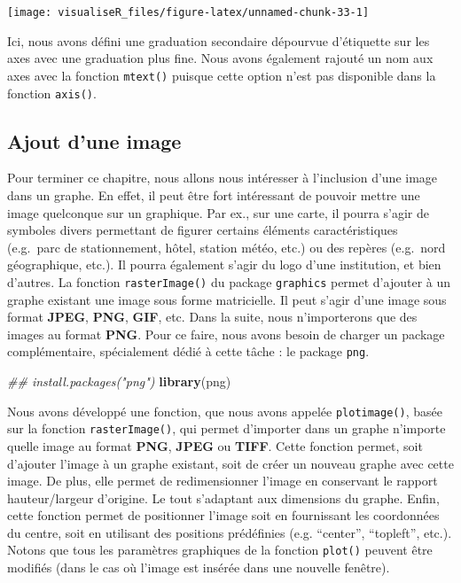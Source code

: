 \documentclass[]{article}
\newenvironment{Shaded}{\begin{snugshade}}{\end{snugshade}}
\newcommand{\CommentTok}[1]{\textcolor[rgb]{0.56,0.35,0.01}{\textit{#1}}}
\newcommand{\KeywordTok}[1]{\textcolor[rgb]{0.13,0.29,0.53}{\textbf{#1}}}
\newcommand{\NormalTok}[1]{#1}
\begin{document}
\begin{center}\texttt{[image: visualiseR\_files/figure-latex/unnamed-chunk-33-1]} \end{center}

Ici, nous avons défini une graduation secondaire dépourvue d'étiquette sur les axes avec une graduation plus fine. Nous avons également rajouté un nom aux axes avec la fonction \texttt{mtext()} puisque cette option n'est pas disponible dans la fonction \texttt{axis()}.

\hypertarget{ajout-dune-image}{%
\subsection{Ajout d'une image}\label{ajout-dune-image}}

Pour terminer ce chapitre, nous allons nous intéresser à l'inclusion d'une image dans un graphe. En effet, il peut être fort intéressant de pouvoir mettre une image quelconque sur un graphique. Par ex., sur une carte, il pourra s'agir de symboles divers permettant de figurer certains éléments caractéristiques (e.g.~parc de stationnement, hôtel, station météo, etc.) ou des repères (e.g.~nord géographique, etc.). Il pourra également s'agir du logo d'une institution, et bien d'autres.
La fonction \texttt{rasterImage()} du package \texttt{graphics} permet d'ajouter à un graphe existant une image sous forme matricielle. Il peut s'agir d'une image sous format \textbf{JPEG}, \textbf{PNG}, \textbf{GIF}, etc. Dans la suite, nous n'importerons que des images au format \textbf{PNG}. Pour ce faire, nous avons besoin de charger un package complémentaire, spécialement dédié à cette tâche : le package \texttt{png}.

\begin{Shaded}
\begin{Highlighting}[]
\CommentTok{## install.packages("png")}
\KeywordTok{library}\NormalTok{(png)}
\end{Highlighting}
\end{Shaded}

Nous avons développé une fonction, que nous avons appelée \texttt{plotimage()}, basée sur la fonction \texttt{rasterImage()}, qui permet d'importer dans un graphe n'importe quelle image au format \textbf{PNG}, \textbf{JPEG} ou \textbf{TIFF}. Cette fonction permet, soit d'ajouter l'image à un graphe existant, soit de créer un nouveau graphe avec cette image. De plus, elle permet de redimensionner l'image en conservant le rapport hauteur/largeur d'origine. Le tout s'adaptant aux dimensions du graphe. Enfin, cette fonction permet de positionner l'image soit en fournissant les coordonnées du centre, soit en utilisant des positions prédéfinies (e.g. ``center'', ``topleft'', etc.). Notons que tous les paramètres graphiques de la fonction \texttt{plot()} peuvent être modifiés (dans le cas où l'image est insérée dans une nouvelle fenêtre).
\end{document}

